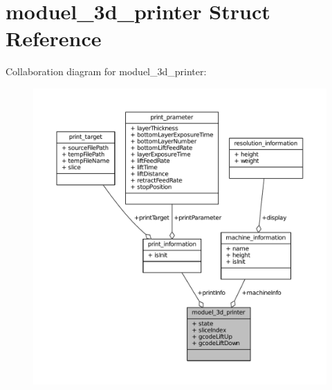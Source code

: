 \hypertarget{structmoduel__3d__printer}{}\section{moduel\+\_\+3d\+\_\+printer Struct Reference}
\label{structmoduel__3d__printer}


Collaboration diagram for moduel\+\_\+3d\+\_\+printer\+:\nopagebreak
\begin{figure}[H]
\begin{center}
\leavevmode
\includegraphics[width=350pt]{structmoduel__3d__printer__coll__graph}
\end{center}
\end{figure}
